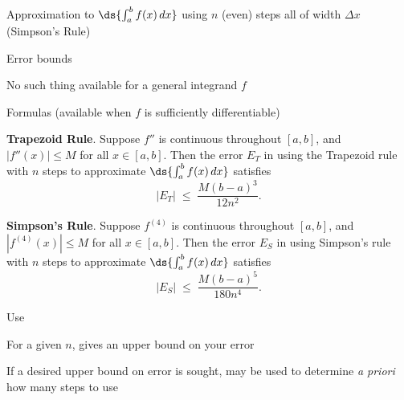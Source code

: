 \documentclass[12pt,fleqn]{article}
\begin{document}
	\vspace{0.2in}
	\item
	  Approximation to $\ds{\int_a^b f(x)\,dx}$ using $n$ (even)
	  steps all of width $\Delta x$ (Simpson's Rule)
	\ei
  \ei
\vspace{0.5in}
\item Error bounds
  \bi
  \item No such thing available for a general integrand $f$
  \item Formulas (available when $f$ is sufficiently differentiable)
	\bi
	\item
	  {\bf Trapezoid Rule}.
	  Suppose $f''$ is continuous throughout $[a,b]$, and $|f''(x)| \le M$
	  for all $x\in [a,b]$.  Then the error $E_T$ in using the Trapezoid
	  rule with $n$ steps to approximate $\ds{\int_a^b f(x)\,dx}$ satisfies
	  $$ |E_T| \;\le\; \frac{M (b-a)^3}{12n^2}. $$
	\item
	  {\bf Simpson's Rule}.
	  Suppose $f^{(4)}$ is continuous throughout $[a,b]$, and
	  $|f^{(4)}(x)| \le M$ for all $x\in [a,b]$.  Then the error $E_S$
	  in using Simpson's rule with $n$ steps to approximate
	  $\ds{\int_a^b f(x)\,dx}$ satisfies
	  $$ |E_S| \;\le\; \frac{M (b-a)^5}{180n^4}. $$
	\ei
  \item Use
	\bi
	\item
	  For a given $n$, gives an upper bound on your error
	\item
	  If a desired upper bound on error is sought, may be used
	  to determine {\em a priori} how many steps to use
	\ei
  \ei
\ei
\end{document}
